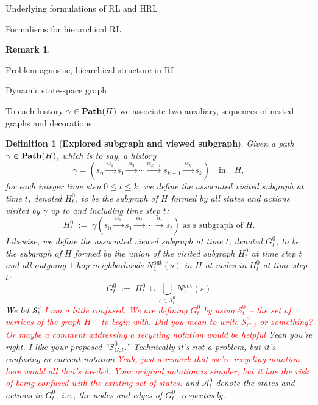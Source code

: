 \documentclass[11pt]{article}
\newtheorem{definition}[subsubsection]{Definition}
\newtheorem{remark}[subsubsection]{Remark}
\begin{document}
\begin{section}{Underlying formulations of RL and HRL}
\begin{subsection}{Formalisms for hierarchical RL}
\begin{remark}
\end{remark}

\end{subsection}

\end{section}


\begin{section}{Problem agnostic, hiearchical structure in RL}

\begin{subsection}{Dynamic state-space graph}

To each history $\gamma\in\bold{Path}(H)$ we associate two auxiliary, sequences of nested graphs and decorations.

\begin{definition}[{\bf Explored subgraph and viewed subgraph}]
\normalfont
Given a path $\gamma\in\bold{Path}(H)$, which is to say, a history
\begin{equation}\label{eq: gamma history}
\gamma=\left(s_{0}\xrightarrow{\ \alpha_{1}\ }s_{1}\xrightarrow{\ \alpha_{2}\ }\cdots\xrightarrow{\alpha_{k-1}}s_{k-1}\xrightarrow{\ \alpha_{k}\ }s_{k}\right)\quad\text{in}\quad H,
\end{equation}
for each integer time step $0\le t\le k$, we define the associated {\em visited subgraph at time $t$}, denoted $H^{0}_{t}$, to be the subgraph of $H$ formed by all states and actions visited by $\gamma$ up to and including time step $t$:
$$
H^{0}_{t}\;:=\;\gamma\left(s_{0}\xrightarrow{\ \alpha_{1}\ }s_{1}\xrightarrow{\ \alpha_{2}\ }\cdots\xrightarrow{\ \alpha_{t}\ }s_{t}\right)\;\text{as s subgraph of}\;H.
$$
Likewise, we define the associated {\em viewed subgraph at time $t$}, denoted $G^{0}_{t}$, to be the subgraph of $H$ formed by the union of the visited subgraph $H^{0}_{t}$ at time step $t$ and all outgoing $1$-hop neighborhoods $N^{\text{out}\!}_{1}(s)$ in $H$ at nodes in $H^{0}_{t}$ at time step $t$:
$$
G^{0}_{t}
\;:=\;
H^{0}_{t}\;\cup\bigcup_{s\in \mathcal{S}^{0}_{t}}
\!\!N^{\text{out}\!}_{1}(s)
$$
We let $\mathcal{S}^{0}_{t}$ \textcolor{red}{I am a little confused. We are defining $G^0_t$ by using $\mathcal{S}^0_t$ -- the set of vertices of the graph $H$ -- to begin with. Did you mean to write $\mathcal{S}^0_{G,t}$ or something? Or maybe a comment addressing a recycling notation would be helpful} {\color{blue} Yeah you're right. I like your proposed ``$\mathcal{S}^{0}_{G,t}$.'' Technically it's not a problem, but it's confusing in current notation.}\textcolor{red}{Yeah, just a remark that we're recycling notation here would all that's needed. Your original notation is simpler, but it has the risk of being confused with the existing set of states.} and $\mathcal{A}^{0}_{t}$ denote the states and actions in $G^{0}_{t}$, i.e., the nodes and edges of $G^{0}_{t}$, respectively.

\end{definition}
\end{subsection}
\end{section}
\end{document}
